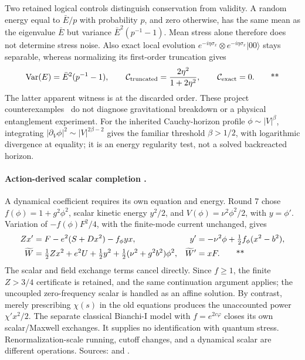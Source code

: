 Two retained logical controls distinguish conservation from validity.
A random energy equal to \(\bar E/p\) with probability \(p\), and zero
otherwise, has the same mean as the eigenvalue \(\bar E\) but variance
\(\bar E^2(p^{-1}-1)\).  Mean stress alone therefore does not determine
stress noise.  Also exact local evolution
\(e^{-i\eta\sigma_x}\otimes e^{-i\eta\sigma_x}|00\rangle\) stays separable,
whereas normalizing its first-order truncation gives
\begin{equation}
 \operatorname{Var}(E)=\bar E^2(p^{-1}-1),\qquad
 \mathcal C_{\rm truncated}=\frac{2\eta^2}{1+2\eta^2},\qquad
 \mathcal C_{\rm exact}=0.\qquad\text{**}
 \label{early:logicalcontrols}
\end{equation}
The latter apparent witness is at the discarded order.
These project counterexamples \workstar\ do not diagnose gravitational
breakdown or a physical entanglement experiment.  For the inherited
Cauchy-horizon profile \(\phi\sim|V|^\beta\), integrating
\(|\partial_V\phi|^2\sim|V|^{2\beta-2}\) gives the familiar threshold
\(\beta>1/2\), with logarithmic divergence at equality; it is an energy
regularity test, not a solved backreacted horizon.

\paragraph{Action-derived scalar completion \workstar.}
A dynamical coefficient requires its own equation and energy.  Round 7 chose
\(f(\phi)=1+g^2\phi^2\), scalar kinetic energy \(y^2/2\), and
\(V(\phi)=\nu^2\phi^2/2\), with \(y=\phi'\).  Variation of
\(-f(\phi)F^2/4\), with the finite-mode current unchanged, gives
\begin{align}
 Zx'&=F-e^2(S+Dx^2)-f_\phi yx,&
 y'&=-\nu^2\phi+\tfrac12f_\phi(x^2-b^2),\notag\\
 \widetilde W&=\tfrac12Zx^2+e^2U+\tfrac12y^2+
 \tfrac12(\nu^2+g^2b^2)\phi^2,&
 \widetilde W'&=xF.
 \qquad\text{**}\label{early:scalar}
\end{align}
The scalar and field exchange terms cancel directly.  Since \(f\ge1\), the
finite \(Z>3/4\) certificate is retained, and the same continuation argument
applies; the uncoupled zero-frequency scalar is handled as an affine solution.
By contrast, merely prescribing \(\chi(s)\) in the old equations produces the
unaccounted power \(\chi'x^2/2\).  The separate classical Bianchi-I model
with \(f=e^{2c\varphi}\) closes its own scalar/Maxwell exchanges.  It supplies
no identification with quantum stress.  Renormalization-scale running,
cutoff changes, and a dynamical scalar are different operations.  Sources:
 and
.

